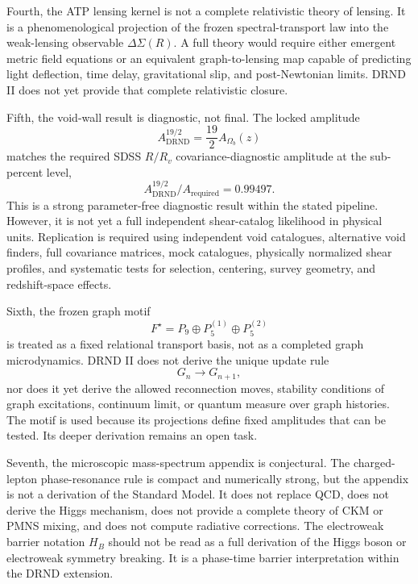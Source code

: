 \documentclass[12pt]{iopart}
\begin{document}
Fourth, the ATP lensing kernel is not a complete relativistic theory of lensing. It is a phenomenological projection of the frozen spectral-transport law into the weak-lensing observable \(\Delta\Sigma(R)\). A full theory would require either emergent metric field equations or an equivalent graph-to-lensing map capable of predicting light deflection, time delay, gravitational slip, and post-Newtonian limits. DRND II does not yet provide that complete relativistic closure.

Fifth, the void-wall result is diagnostic, not final. The locked amplitude
\begin{equation}
A_{\mathrm{DRND}}^{19/2}
=
\frac{19}{2}A_{\Omega_b}(z)
\end{equation}
matches the required SDSS \(R/R_v\) covariance-diagnostic amplitude at the sub-percent level,
\begin{equation}
A_{\mathrm{DRND}}^{19/2}/A_{\mathrm{required}}=0.99497.
\end{equation}
This is a strong parameter-free diagnostic result within the stated pipeline. However, it is not yet a full independent shear-catalog likelihood in physical units. Replication is required using independent void catalogues, alternative void finders, full covariance matrices, mock catalogues, physically normalized shear profiles, and systematic tests for selection, centering, survey geometry, and redshift-space effects.

Sixth, the frozen graph motif
\begin{equation}
F^\star=P_9\oplus P_5^{(1)}\oplus P_5^{(2)}
\end{equation}
is treated as a fixed relational transport basis, not as a completed graph microdynamics. DRND II does not derive the unique update rule
\begin{equation}
G_n\rightarrow G_{n+1},
\end{equation}
nor does it yet derive the allowed reconnection moves, stability conditions of graph excitations, continuum limit, or quantum measure over graph histories. The motif is used because its projections define fixed amplitudes that can be tested. Its deeper derivation remains an open task.

Seventh, the microscopic mass-spectrum appendix is conjectural. The charged-lepton phase-resonance rule is compact and numerically strong, but the appendix is not a derivation of the Standard Model. It does not replace QCD, does not derive the Higgs mechanism, does not provide a complete theory of CKM or PMNS mixing, and does not compute radiative corrections. The electroweak barrier notation \(H_B\) should not be read as a full derivation of the Higgs boson or electroweak symmetry breaking. It is a phase-time barrier interpretation within the DRND extension.
\end{document}
